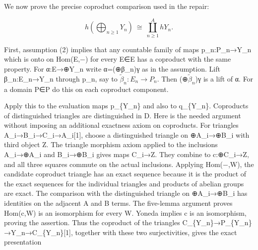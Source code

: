 We now prove the precise coproduct comparison used in the repair:\allowbreak{}

\[
 h\left(\bigoplus_{n\ge1}Y_n\right)
       \ \cong\ \coprod_{n\ge1}^{A}hY_n. \tag{2.2}
\]

First,\allowbreak{} assumption (2)\allowbreak{} implies that any countable family of maps p\_\allowbreak{}n:\allowbreak{}P\_\allowbreak{}n\allowbreak{}→Y\_\allowbreak{}n which is onto on Hom(E,\allowbreak{}−)\allowbreak{} for every E\allowbreak{}∈E has a coproduct with the same property. For α:\allowbreak{}E\allowbreak{}→\allowbreak{}⊕Y\_\allowbreak{}n write α\allowbreak{}=(\allowbreak{}⊕β\_\allowbreak{}n)\allowbreak{}γ as in the assumption. Lift β\_\allowbreak{}n:\allowbreak{}E\_\allowbreak{}n\allowbreak{}→Y\_\allowbreak{}n through p\_\allowbreak{}n,\allowbreak{} say to \(\widetilde\beta_n:E_n\to P_n\). Then (\allowbreak{}⊕\(\widetilde\beta_n\))\allowbreak{}γ is a lift of α. For a domain P\allowbreak{}∈P do this on each coproduct component.

Apply this to the evaluation maps p\_\allowbreak{}\{Y\_\allowbreak{}n\} and also to q\_\allowbreak{}\{Y\_\allowbreak{}n\}. Coproducts of distinguished triangles are distinguished in D. Here is the needed argument without imposing an additional exactness axiom on coproducts. For triangles A\_\allowbreak{}i\allowbreak{}→B\_\allowbreak{}i\allowbreak{}→C\_\allowbreak{}i\allowbreak{}→A\_\allowbreak{}i[1]\allowbreak{},\allowbreak{} choose a distinguished triangle on \allowbreak{}⊕A\_\allowbreak{}i\allowbreak{}→\allowbreak{}⊕B\_\allowbreak{}i with third object Z. The triangle morphism axiom applied to the inclusions A\_\allowbreak{}i\allowbreak{}→\allowbreak{}⊕A\_\allowbreak{}i and B\_\allowbreak{}i\allowbreak{}→\allowbreak{}⊕B\_\allowbreak{}i gives maps C\_\allowbreak{}i\allowbreak{}→Z. They combine to c:\allowbreak{}\allowbreak{}⊕C\_\allowbreak{}i\allowbreak{}→Z,\allowbreak{} and all three squares commute on the actual inclusions. Applying Hom(−,\allowbreak{}W)\allowbreak{},\allowbreak{} the candidate coproduct triangle has an exact sequence because it is the product of the exact sequences for the individual triangles and products of abelian groups are exact. The comparison with the distinguished triangle on \allowbreak{}⊕A\_\allowbreak{}i\allowbreak{}→\allowbreak{}⊕B\_\allowbreak{}i has identities on the adjacent A and B terms. The five-lemma argument proves Hom(c,\allowbreak{}W)\allowbreak{} is an isomorphism for every W. Yoneda implies c is an isomorphism,\allowbreak{} proving the assertion. Thus the coproduct of the triangles C\_\allowbreak{}\{Y\_\allowbreak{}n\}\allowbreak{}→P\_\allowbreak{}\{Y\_\allowbreak{}n\}\allowbreak{}→Y\_\allowbreak{}n\allowbreak{}→C\_\allowbreak{}\{Y\_\allowbreak{}n\}[1]\allowbreak{},\allowbreak{} together with these two surjectivities,\allowbreak{} gives the exact presentation

